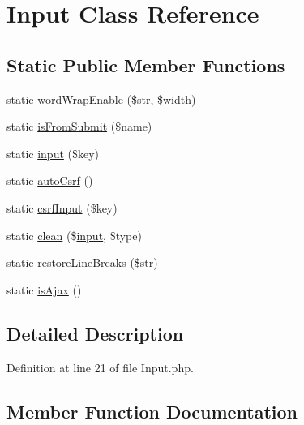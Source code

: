 \hypertarget{class_zest_1_1_input_1_1_input}{}\section{Input Class Reference}
\label{class_zest_1_1_input_1_1_input}
\subsection*{Static Public Member Functions}
\begin{DoxyCompactItemize}
\item 
static \mbox{\hyperlink{class_zest_1_1_input_1_1_input_a4083d5e802e6866eaf9bad44f01dffbb}{word\+Wrap\+Enable}} (\$str, \$width)
\item 
static \mbox{\hyperlink{class_zest_1_1_input_1_1_input_ae207ff15e4180edd01103a5df5967850}{is\+From\+Submit}} (\$name)
\item 
static \mbox{\hyperlink{class_zest_1_1_input_1_1_input_a3a0ac15a2db6f690f8cd1b4e59b12924}{input}} (\$key)
\item 
static \mbox{\hyperlink{class_zest_1_1_input_1_1_input_a2b65ea249cea8c54bdf821d6d2623ff8}{auto\+Csrf}} ()
\item 
static \mbox{\hyperlink{class_zest_1_1_input_1_1_input_a1c124976655b4248fedccd9587a94eaa}{csrf\+Input}} (\$key)
\item 
static \mbox{\hyperlink{class_zest_1_1_input_1_1_input_a56f40473b47394481ddb1018ac904aef}{clean}} (\$\mbox{\hyperlink{class_zest_1_1_input_1_1_input_a3a0ac15a2db6f690f8cd1b4e59b12924}{input}}, \$type)
\item 
static \mbox{\hyperlink{class_zest_1_1_input_1_1_input_adb807f02238a7bceb0d65c3dcddffa2a}{restore\+Line\+Breaks}} (\$str)
\item 
static \mbox{\hyperlink{class_zest_1_1_input_1_1_input_a2b266c0de7a87b606b3926baafe483e5}{is\+Ajax}} ()
\end{DoxyCompactItemize}


\subsection{Detailed Description}


Definition at line 21 of file Input.\+php.



\subsection{Member Function Documentation}
\mbox{\label{class_zest_1_1_input_1_1_input_a2b65ea249cea8c54bdf821d6d2623ff8}} 
